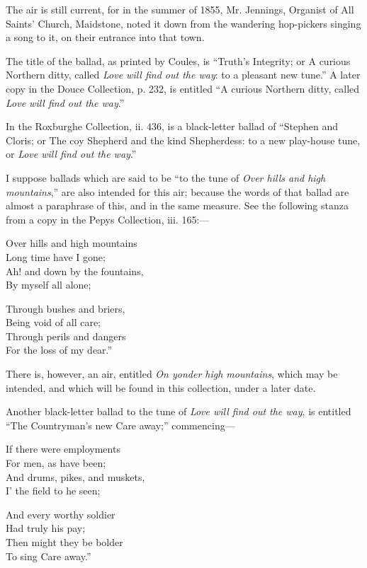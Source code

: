 The air is still current, for in the summer of 1855, Mr. Jennings, Organist of
All Saints’ Church, Maidstone, noted it down from the wandering hop-pickers
singing a song to it, on their entrance into that town.

The title of the ballad, as printed by Coules, is “Truth’s Integrity; or
A curious Northern ditty, called \textit{Love will find out the way}: to a pleasant new
tune.” A later copy in the Douce Collection, p. 232, is entitled “A curious
Northern ditty, called \textit{Love will find out the way}.”

In the Roxburghe Collection, ii. 436, is a black-letter ballad of “Stephen and
Cloris; or The coy Shepherd and the kind Shepherdess: to a new play-house
tune, or \textit{Love will find out the way}.”

I suppose ballads which are said to be “to the tune of \textit{Over hills and high
mountains},” are also intended for this air; because the words of that ballad are
almost a paraphrase of this, and in the same measure. See the following stanza
from a copy in the Pepys Collection, iii. 165:—

\settowidth{\versewidth}{Ah! and down by the fountains,}
\begin{dcverse}\begin{altverse}
Over hills and high mountains\\
Long time have I gone;\\
Ah! and down by the fountains,\\
By myself all alone;
\end{altverse}

\begin{altverse}
Through bushes and briers,\\
Being void of all care;\\
Through perils and dangers\\
For the loss of my dear.”
\end{altverse}
\end{dcverse}

There is, however, an air, entitled \textit{On yonder high mountains}, which may be intended,
and which will be found in this collection, under a later date.

Another black-letter ballad to the tune of \textit{Love will find out the way}, is entitled
“The Countryman’s new Care away;” commencing—

\begin{dcverse}\begin{altverse}
If there were employments\\
For men, as have been;\\
And drums, pikes, and muskets,\\
I’ the field to he seen;
\end{altverse}

\begin{altverse}
And every worthy soldier\\
Had truly his pay;\\
Then might they be bolder\\
To sing Care away.”
\end{altverse}
\end{dcverse}

